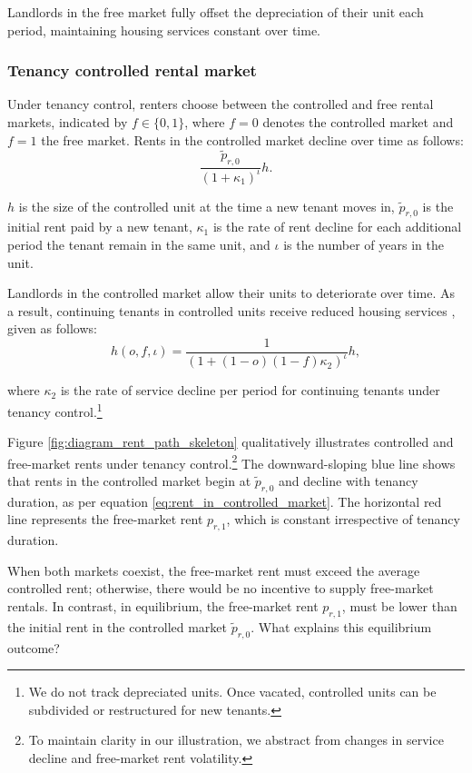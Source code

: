 \documentclass[parskip=full]{article}
\begin{document}
Landlords in the free market fully offset the
depreciation of their unit each period, maintaining housing services constant over time.

\subsubsection{Tenancy controlled rental market}

Under tenancy control, renters choose between the controlled and free rental markets, indicated by $f \in \{0,1\}$, where $f=0$ denotes the controlled market and $f=1$ the free market. Rents in the controlled market decline over time as follows:
\begin{equation}\label{eq:rent_in_controlled_market}
\frac{\tilde{p}_{r,0}}{(1+\kappa_{1})^{\iota}} h.
\end{equation} 

\noindent $h$ is the size of the controlled unit at the time a new tenant moves in, $\tilde{p}_{r,0}$ is the initial rent paid by a new tenant, $\kappa_{1}$ is the rate of rent decline for each additional period the tenant remain in the same unit, and $\iota$ is the number of years in the unit.

Landlords in the controlled market allow their units to deteriorate over time. As a result, continuing tenants in controlled units receive reduced housing services \citep{gl-1990,murray_et_al-1991}, given as follows:
\begin{equation}
h(o,f,\iota)=\frac{1}{(1+(1-o)(1-f)\kappa_{2})^{\iota}} h,
\end{equation}
 
\noindent where $\kappa_{2}$ is the rate of service decline per period for continuing tenants under tenancy control.\footnote{We do not track depreciated units. Once vacated, controlled units can be subdivided or restructured for new tenants.}

Figure \ref{fig:diagram_rent_path_skeleton} qualitatively illustrates controlled and free-market rents under tenancy control.\footnote{To maintain clarity in our illustration, we abstract from changes in service decline and free-market rent volatility.} The downward-sloping blue line shows that rents in the controlled market begin at $\tilde{p}_{r,0}$ and decline with tenancy duration, as per equation \eqref{eq:rent_in_controlled_market}. The horizontal red line represents the free-market rent $p_{r,1}$, which is constant irrespective of tenancy duration. 

When both markets coexist, the free-market rent must exceed the average controlled rent; otherwise, there would be no incentive to supply free-market rentals. In contrast, in equilibrium, the free-market rent $p_{r,1}$, must be lower than the initial rent in the controlled market $\tilde{p}_{r,0}$. What explains this equilibrium outcome?
\end{document}
